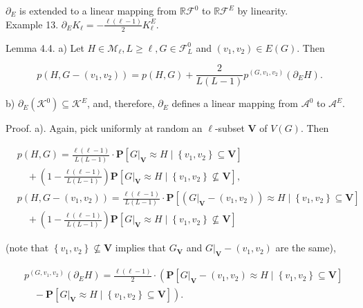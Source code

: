 \documentclass[10pt]{article}
\begin{document}
$\partial_{E}$ is extended to a linear mapping from $\mathbb{R} \mathcal{F}^{0}$ to $\mathbb{R} \mathcal{F}^{E}$ by linearity.\\
Example 13. $\partial_{E} K_{\ell}=-\frac{\ell(\ell-1)}{2} K_{\ell}^{E}$.

Lemma 4.4. a) Let $H \in \mathcal{M}_{\ell}, L \geq \ell, G \in \mathcal{F}_{L}^{0}$ and $\left(v_{1}, v_{2}\right) \in E(G)$. Then

$$
p\left(H, G-\left(v_{1}, v_{2}\right)\right)=p(H, G)+\frac{2}{L(L-1)} p^{\left(G, v_{1}, v_{2}\right)}\left(\partial_{E} H\right) .
$$

b) $\partial_{E}\left(\mathcal{K}^{0}\right) \subseteq \mathcal{K}^{E}$, and, therefore, $\partial_{E}$ defines a linear mapping from $\mathcal{A}^{0}$ to $\mathcal{A}^{E}$.

Proof. a). Again, pick uniformly at random an $\ell$-subset $\boldsymbol{V}$ of $V(G)$. Then

$$
\begin{aligned}
& p(H, G)=\frac{\ell(\ell-1)}{L(L-1)} \cdot \mathbf{P}\left[\left.G\right|_{\boldsymbol{V}} \approx H \mid\left\{v_{1}, v_{2}\right\} \subseteq \boldsymbol{V}\right] \\
& \quad+\left(1-\frac{\ell(\ell-1)}{L(L-1)}\right) \mathbf{P}\left[\left.G\right|_{\boldsymbol{V}} \approx H \mid\left\{v_{1}, v_{2}\right\} \nsubseteq \boldsymbol{V}\right], \\
& p\left(H, G-\left(v_{1}, v_{2}\right)\right)=\frac{\ell(\ell-1)}{L(L-1)} \cdot \mathbf{P}\left[\left(\left.G\right|_{\boldsymbol{V}}-\left(v_{1}, v_{2}\right)\right) \approx H \mid\left\{v_{1}, v_{2}\right\} \subseteq \boldsymbol{V}\right] \\
& \quad+\left(1-\frac{\ell(\ell-1)}{L(L-1)}\right) \mathbf{P}\left[\left.G\right|_{\boldsymbol{V}} \approx H \mid\left\{v_{1}, v_{2}\right\} \nsubseteq \boldsymbol{V}\right]
\end{aligned}
$$

(note that $\left\{v_{1}, v_{2}\right\} \nsubseteq \boldsymbol{V}$ implies that $G_{\boldsymbol{V}}$ and $\left.G\right|_{\boldsymbol{V}}-\left(v_{1}, v_{2}\right)$ are the same),

$$
\begin{aligned}
& p^{\left(G, v_{1}, v_{2}\right)}\left(\partial_{E} H\right)=\frac{\ell(\ell-1)}{2} \cdot\left(\mathbf{P}\left[\left.G\right|_{\boldsymbol{V}}-\left(v_{1}, v_{2}\right) \approx H \mid\left\{v_{1}, v_{2}\right\} \subseteq \boldsymbol{V}\right]\right. \\
& \left.\quad-\mathbf{P}\left[\left.G\right|_{\boldsymbol{V}} \approx H \mid\left\{v_{1}, v_{2}\right\} \subseteq \boldsymbol{V}\right]\right) .
\end{aligned}
$$
\end{document}
